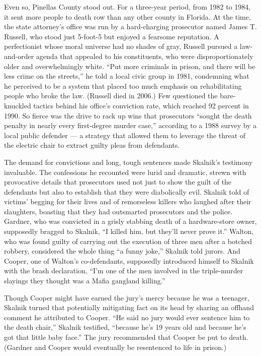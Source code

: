 Even so, Pinellas County stood out. For a three-year period, from 1982
to 1984, it sent more people to death row than any other county in
Florida. At the time, the state attorney's office was run by a
hard-charging prosecutor named James T. Russell, who stood just 5-foot-5
but enjoyed a fearsome reputation. A perfectionist whose moral universe
had no shades of gray, Russell pursued a law-and-order agenda that
appealed to his constituents, who were disproportionately older and
overwhelmingly white. ``Put more criminals in prison, and there will be
less crime on the streets,'' he told a local civic group in 1981,
condemning what he perceived to be a system that placed too much
emphasis on rehabilitating people who broke the law. (Russell died in
2006.) Few questioned the bare-knuckled tactics behind his office's
conviction rate, which reached 92 percent in 1990. So fierce was the
drive to rack up wins that prosecutors ``sought the death penalty in
nearly every first-degree murder case,'' according to a 1988 survey by a
local public defender --- a strategy that allowed them to leverage the
threat of the electric chair to extract guilty pleas from defendants.

The demand for convictions and long, tough sentences made Skalnik's
testimony invaluable. The confessions he recounted were lurid and
dramatic, strewn with provocative details that prosecutors used not just
to show the guilt of the defendants but also to establish that they were
diabolically evil. Skalnik told of victims' begging for their lives and
of remorseless killers who laughed after their slaughters, boasting that
they had outsmarted prosecutors and the police. Gardner, who was
convicted in a grisly stabbing death of a hardware-store owner,
supposedly bragged to Skalnik, ``I killed him, but they'll never prove
it.'' Walton, who was found guilty of carrying out the execution of
three men after a botched robbery, considered the whole thing ``a funny
joke,'' Skalnik told jurors. And Cooper, one of Walton's co-defendants,
supposedly introduced himself to Skalnik with the brash declaration,
``I'm one of the men involved in the triple-murder slayings they thought
was a Mafia gangland killing.''

Though Cooper might have earned the jury's mercy because he was a
teenager, Skalnik turned that potentially mitigating fact on its head by
sharing an offhand comment he attributed to Cooper. ``He said no jury
would ever sentence him to the death chair,'' Skalnik testified,
``because he's 19 years old and because he's got that little baby
face.'' The jury recommended that Cooper be put to death. (Gardner and
Cooper would eventually be resentenced to life in prison.)

